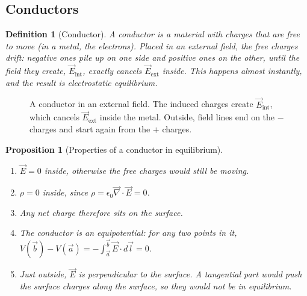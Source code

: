 \documentclass{article}
\newtheorem{definition}{Definition}
\newtheorem{proposition}{Proposition}
\begin{document}
\subsection{Conductors}
\begin{definition}[Conductor]
    A conductor is a material with charges that are free to move (in a metal, the electrons). Placed in an external field, the free charges drift: negative ones pile up on one side and positive ones on the other, until the field they create, $\vec{E}_{\text{int}}$, exactly cancels $\vec{E}_{\text{ext}}$ inside. This happens almost instantly, and the result is electrostatic equilibrium.
\end{definition}
\begin{figure}[H]
    \centering
    \caption{A conductor in an external field. The induced charges create $\vec{E}_{\text{int}}$, which cancels $\vec{E}_{\text{ext}}$ inside the metal. Outside, field lines end on the $-$ charges and start again from the $+$ charges.}
\end{figure}
\begin{proposition}[Properties of a conductor in equilibrium]
    \begin{enumerate}[label=(\roman*)]
        \item $\vec{E} = 0$ inside, otherwise the free charges would still be moving.
        \item $\rho = 0$ inside, since $\rho = \epsilon_0\vec{\nabla}\cdot\vec{E} = 0$.
        \item Any net charge therefore sits on the surface.
        \item The conductor is an equipotential: for any two points in it, $V(\vec{b}) - V(\vec{a}) = -\int_{\vec{a}}^{\vec{b}}\vec{E}\cdot d\vec{l} = 0$.
        \item Just outside, $\vec{E}$ is perpendicular to the surface. A tangential part would push the surface charges along the surface, so they would not be in equilibrium.
    \end{enumerate}
\end{proposition}
\end{document}

